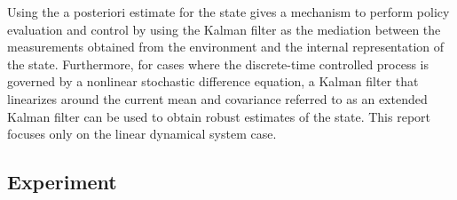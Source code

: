 \documentclass{article}
\begin{document}
Using the a posteriori estimate for the state gives a mechanism to perform policy evaluation and control by using the Kalman filter as the mediation between the measurements obtained from the environment and the internal representation of the state. Furthermore, for cases where the discrete-time controlled process is governed by a nonlinear stochastic difference equation, a Kalman filter that linearizes around the current mean and covariance referred to as an extended Kalman filter can be used to obtain robust estimates of the state. This report focuses only on the linear dynamical system case.

\subsection{Experiment}
\end{document}
